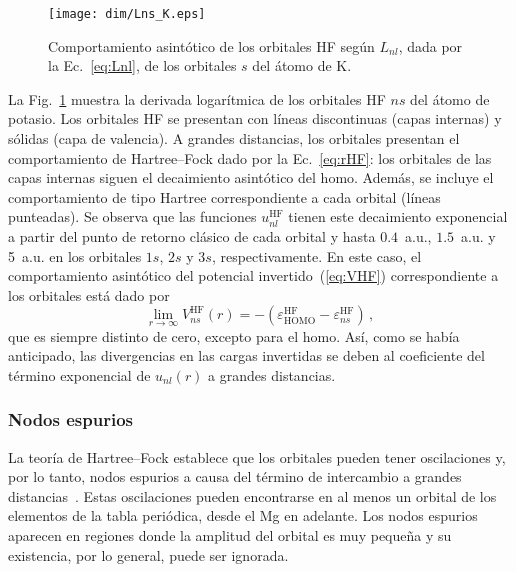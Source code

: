 {{{\begin{figure}[t]
\centering
\texttt{[image: dim/Lns\_K.eps]} 
\caption[Comportamiento asintótico de los orbitales HF.]
{Comportamiento asintótico de los orbitales HF según $L_{nl}$, dada por 
la Ec.~\ref{eq:Lnl}, de los orbitales $s$ del átomo de K.}
\label{fig:LnsK}
\end{figure}

La Fig.~\ref{fig:LnsK} muestra la derivada logarítmica de los orbitales 
HF $ns$ del átomo de potasio. Los orbitales HF se presentan con líneas 
discontinuas (capas internas) y sólidas (capa de valencia). A grandes 
distancias, los orbitales presentan el comportamiento de Hartree--Fock 
dado por la Ec.~\ref{eq:rHF}: los orbitales de las capas internas siguen 
el decaimiento asintótico del \acs{homo}. Además, se incluye el 
comportamiento de tipo Hartree correspondiente a cada orbital (líneas 
punteadas). Se observa que las funciones $u_{nl}^{\mathrm{HF}}$ tienen 
este decaimiento exponencial a partir del punto de retorno clásico de 
cada orbital y hasta $0.4$~a.u., $1.5$~a.u. y 5~a.u. en los orbitales 
$1s$, $2s$ y $3s$, respectivamente. 
En este caso, el comportamiento asintótico del potencial 
invertido~(\ref{eq:VHF}) correspondiente a los orbitales está dado por
\begin{equation}
\lim_{r \rightarrow \infty} V_{ns}^{\mathrm{HF}}(r)=
-\left(\varepsilon_{\mathrm{HOMO}}^{\mathrm{HF}}
-\varepsilon_{ns}^{\mathrm{HF}}\right) \,,
\label{eq:asintoticoVHF}
\end{equation}
que es siempre distinto de cero, excepto para el \acs{homo}. Así, como 
se había anticipado, las divergencias en las cargas invertidas se deben 
al coeficiente del término exponencial de $u_{nl}(r)$ a grandes 
distancias. 

\subsubsection*{Nodos espurios}

La teoría de Hartree--Fock establece que los orbitales pueden tener 
oscilaciones y, por lo tanto, nodos espurios a causa del término de 
intercambio a grandes distancias~\cite{FroeseFischer:97}. Estas 
oscilaciones pueden encontrarse en al menos un orbital de los elementos 
de la tabla periódica, desde el Mg en adelante. Los nodos espurios 
aparecen en regiones donde la amplitud del orbital es muy pequeña y su 
existencia, por lo general, puede ser ignorada. 

}}}
